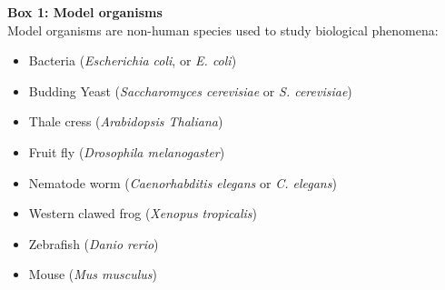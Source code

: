 
\newpage

\begin{Comment}
\hspace{-2.5mm}\textbf{Box 1: Model organisms}\label{box1}\\

Model organisms are non-human species used to study biological phenomena:

\begin{itemize}
    \item Bacteria (\textit{Escherichia coli}, or \textit{E. coli})
    \item Budding Yeast (\textit{Saccharomyces cerevisiae} or \textit{S. cerevisiae})
    \item Thale cress (\textit{Arabidopsis Thaliana})
    \item Fruit fly (\textit{Drosophila melanogaster})
    \item Nematode worm (\textit{Caenorhabditis elegans} or \textit{C. elegans})
    \item Western clawed frog (\textit{Xenopus tropicalis})
    \item Zebrafish (\textit{Danio rerio})
    \item Mouse (\textit{Mus musculus})

\end{itemize}


\end{Comment}

